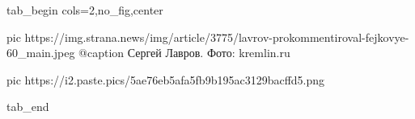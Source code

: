  
 
 
 
 


\ifcmt
  tab_begin cols=2,no_fig,center

     pic https://img.strana.news/img/article/3775/lavrov-prokommentiroval-fejkovye-60_main.jpeg
		 @caption Сергей Лавров. Фото: kremlin.ru 

		 pic https://i2.paste.pics/5ae76eb5afa5fb9b195ac3129bacffd5.png

  tab_end
\fi
